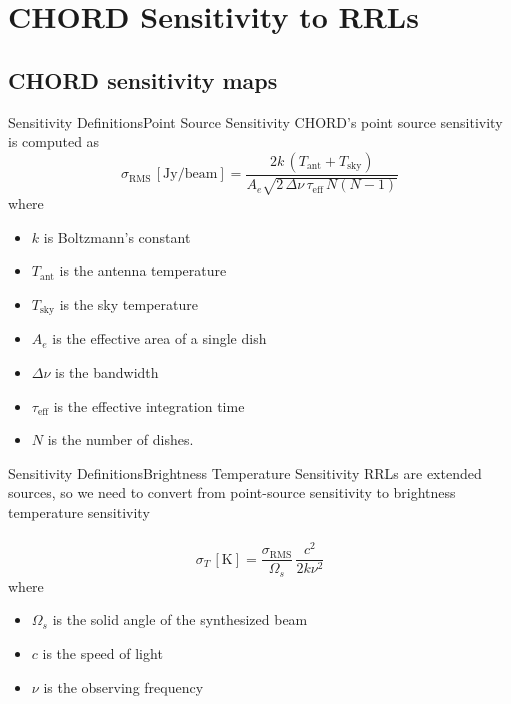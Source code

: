 \documentclass[aspectratio=169,t]{beamer}
\begin{document}
\section{CHORD Sensitivity to RRLs}
\subsection{CHORD sensitivity maps}
\begin{frame}{Sensitivity Definitions}{Point Source Sensitivity}
  CHORD's point source sensitivity is computed as
  \[
  \sigma_{\mathrm{RMS}}\,[\mathrm{Jy/beam}] = \frac{2k\,(T_{\mathrm{ant}}+T_{\mathrm{sky}})}{A_e\sqrt{2\,\Delta\nu\,\tau_{\mathrm{eff}}\,N(N-1)}}
  \]
  where
  \begin{itemize}
    \item $k$ is Boltzmann's constant
    \item $T_{\mathrm{ant}}$ is the antenna temperature
    \item $T_{\mathrm{sky}}$ is the sky temperature
    \item $A_e$ is the effective area of a single dish
    \item $\Delta\nu$ is the bandwidth
    \item $\tau_{\mathrm{eff}}$ is the effective integration time
    \item $N$ is the number of dishes.
  \end{itemize}
\end{frame}

\begin{frame}{Sensitivity Definitions}{Brightness Temperature Sensitivity}
  RRLs are extended sources, so we need to convert from point-source sensitivity to brightness temperature sensitivity\\
  ~\\
  \[
  \sigma_T\,[\mathrm{K}] = \frac{\sigma_{\mathrm{RMS}}}{\Omega_s}\,
\frac{c^2}{2k\nu^2}
  \]
  where
  \begin{itemize}
    \item $\Omega_s$ is the solid angle of the synthesized beam
    \item $c$ is the speed of light
    \item $\nu$ is the observing frequency
  \end{itemize}
\end{frame}
\end{document}
